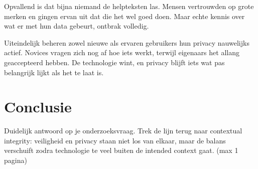 \documentclass[nonacm,sigconf]{acmart}
\begin{document}
    Opvallend is dat bijna niemand de helpteksten las.
    Mensen vertrouwden op grote merken en gingen ervan uit dat die het wel goed doen.
    Maar echte kennis over wat er met hun data gebeurt, ontbrak volledig.

    Uiteindelijk beheren zowel nieuwe als ervaren gebruikers hun privacy nauwelijks actief.
    Novices vragen zich nog af hoe iets werkt, terwijl eigenaars het allang geaccepteerd hebben.
    De technologie wint, en privacy blijft iets wat pas belangrijk lijkt als het te laat is.

    \section{Conclusie}
    Duidelijk antwoord op je onderzoeksvraag.
    Trek de lijn terug naar contextual integrity: veiligheid en privacy staan niet los van elkaar, maar de balans verschuift zodra technologie te veel buiten de intended context gaat. (max 1 pagina)

    \printbibliography

    \balance %
\end{document}
